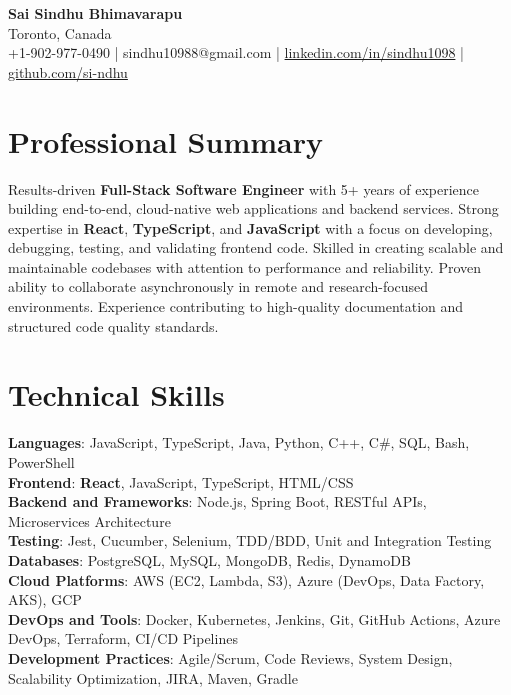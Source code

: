 \documentclass[letterpaper,11pt]{article}
\begin{document}
\begin{center}
  {\Large \textbf{Sai Sindhu Bhimavarapu}} \\
  Toronto, Canada \\
  +1-902-977-0490 \enspace | \enspace sindhu10988@gmail.com \enspace | \enspace \href{https://www.linkedin.com/in/sindhu1098/}{linkedin.com/in/sindhu1098} \enspace | \enspace \href{https://github.com/si-ndhu}{github.com/si-ndhu}
\end{center}

\section{Professional Summary}
  \begin{itemize}[leftmargin=0.15in, label={}]
    \small{\item{
     Results-driven \textbf{Full-Stack Software Engineer} with 5+ years of experience building end-to-end, cloud-native web applications and backend services. Strong expertise in \textbf{React}, \textbf{TypeScript}, and \textbf{JavaScript} with a focus on developing, debugging, testing, and validating frontend code. Skilled in creating scalable and maintainable codebases with attention to performance and reliability. Proven ability to collaborate asynchronously in remote and research-focused environments. Experience contributing to high-quality documentation and structured code quality standards.
    }}
  \end{itemize}
\vspace{-16pt}

\section{Technical Skills}
 \begin{itemize}[leftmargin=0.15in, label={}]
    \small{\item{
     \textbf{Languages}: JavaScript, TypeScript, Java, Python, C++, C\#, SQL, Bash, PowerShell \\
     \textbf{Frontend}: \textbf{React}, JavaScript, TypeScript, HTML/CSS \\
     \textbf{Backend and Frameworks}: Node.js, Spring Boot, RESTful APIs, Microservices Architecture \\
     \textbf{Testing}: Jest, Cucumber, Selenium, TDD/BDD, Unit and Integration Testing \\
     \textbf{Databases}: PostgreSQL, MySQL, MongoDB, Redis, DynamoDB \\
     \textbf{Cloud Platforms}: AWS (EC2, Lambda, S3), Azure (DevOps, Data Factory, AKS), GCP \\
     \textbf{DevOps and Tools}: Docker, Kubernetes, Jenkins, Git, GitHub Actions, Azure DevOps, Terraform, CI/CD Pipelines \\
     \textbf{Development Practices}: Agile/Scrum, Code Reviews, System Design, Scalability Optimization, JIRA, Maven, Gradle
    }}
 \end{itemize}
\vspace{-16pt}
\end{document}
